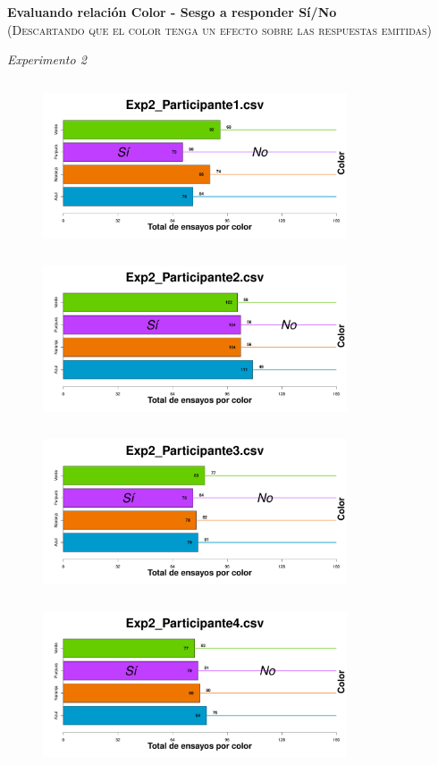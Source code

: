 \documentclass[a4paper ]{article}
\begin{document}
\begin{center}
{\LARGE \textbf{Evaluando relación Color - Sesgo a responder Sí/No}}\\
{\small \textsc{(Descartando que el color tenga un efecto sobre las respuestas emitidas)}}\\
\smallskip
\end{center}
\begin{center}
{\LARGE \textit{Experimento 2}}\\
\end{center}
\vspace{3mm}
\begin{figure}[th]
\centering
\includegraphics[width=9cm, height=5cm]{Figures/BiasColor_Exp2_P1} \includegraphics[width=9cm, height=5cm]{Figures/BiasColor_Exp2_P2} 
\includegraphics[width=9cm, height=5cm]{Figures/BiasColor_Exp2_P3} \includegraphics[width=9cm, height=5cm]{Figures/BiasColor_Exp2_P4} 

\end{figure}
\end{document}
